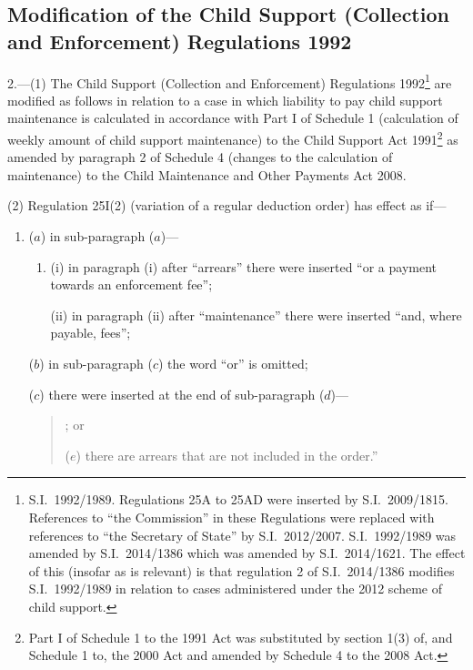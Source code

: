 \documentclass[12pt,a4paper]{article}
\begin{document}
\subsection[2. Modification of the Child Support (Collection and Enforcement) Regulations 1992]{Modification of the Child Support (Collection and Enforcement) Regulations 1992}

2.---(1)
The Child Support (Collection and Enforcement) Regulations 1992\footnote{S.I.~1992/1989. Regulations 25A to 25AD were inserted by S.I.~2009/1815. References to “the Commission” in these Regulations were replaced with references to “the Secretary of State” by S.I.~2012/2007. S.I.~1992/1989 was amended by S.I.~2014/1386 which was amended by S.I.~2014/1621. The effect of this (insofar as is relevant) is that regulation 2 of S.I.~2014/1386 modifies S.I.~1992/1989 in relation to cases administered under the 2012 scheme of child support.} are modified as follows in relation to a case in which liability to pay child support maintenance is calculated in accordance with Part I of Schedule 1 (calculation of weekly amount of child support maintenance) to the Child Support Act 1991\footnote{Part I of Schedule 1 to the 1991 Act was substituted by section 1(3) of, and Schedule 1 to, the 2000 Act and amended by Schedule 4 to the 2008 Act.} as amended by paragraph 2 of Schedule 4 (changes to the calculation of maintenance) to the Child Maintenance and Other Payments Act 2008.

(2)
Regulation 25I(2) (variation of a regular deduction order) has effect as if—
\begin{enumerate}\item[]
($a$)
in sub-paragraph ($a$)—
\begin{enumerate}\item[]
(i)
in paragraph (i) after “arrears” there were inserted “or a payment towards an enforcement fee”;

(ii)
in paragraph (ii) after “maintenance” there were inserted “and, where payable, fees”;
\end{enumerate}

($b$)
in sub-paragraph ($c$) the word “or” is omitted;

($c$)
there were inserted at the end of sub-paragraph ($d$)—
\begin{quotation}
    ; or

    ($e$)
    there are arrears that are not included in the order.”
\end{quotation}
\end{enumerate}
\end{document}
